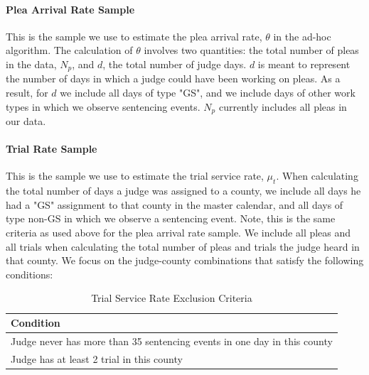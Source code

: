 \documentclass[11pt, oneside]{article}   	%
\theoremstyle{ModifiedStyle}
\begin{document}
			\paragraph{Plea Arrival Rate Sample} This is the sample we use to estimate the plea arrival rate, $\theta$ in the ad-hoc algorithm. The calculation of $\theta$ involves two quantities: the total number of pleas in the data, $N_p$, and $d$, the total number of judge days. $d$ is meant to represent the number of days in which a judge could have been working on pleas. As a result, for $d$ we include all days of type "GS", and we include days of other work types in which we observe sentencing events. $N_p$ currently includes all pleas in our data.

			\paragraph{Trial Rate Sample} This is the sample we use to estimate the trial service rate, $\mu_t$. When calculating the total number of days a judge was assigned to a county, we include all days he had a "GS" assignment to that county in the master calendar, and all days of type non-GS in which we observe a sentencing event. Note, this is the same criteria as used above for the plea arrival rate sample. We include all pleas and all trials when calculating the total number of pleas and trials the judge heard in that county. We focus on the judge-county combinations that satisfy the following conditions:

				\begin{table}[H]
				\centering
				\caption{Trial Service Rate Exclusion Criteria}
				\begin{tabular}{|l|}
				\hline
				\textbf{Condition}                                                       \\ \hline
				Judge never has more than 35 sentencing events in one day in this county \\
				Judge has at least 2 trial in this county                                \\ \hline
				\end{tabular}
				\end{table}
\end{document}
